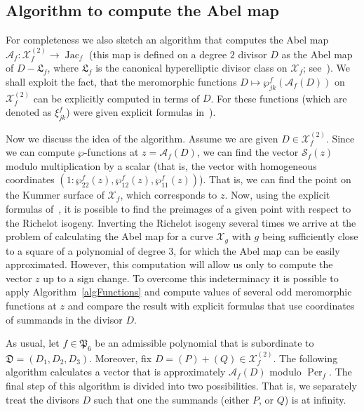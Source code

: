 \documentclass{amsart}
\numberwithin{equation}{section}
\theoremstyle{definition}
\theoremstyle{remark}
\DeclareMathOperator{\Jac}{Jac}
\DeclareMathOperator{\Per}{Per}
\begin{document}
	\subsection{Algorithm to compute the Abel map}
	For completeness we also sketch an algorithm that computes the Abel map $\mathscr A_f: \mathcal X_f^{(2)} \to \Jac_f$ (this map is defined on a degree $2$ divisor $D$ as the Abel map of $D - \mathfrak L_f$, where $\mathfrak L_f$ is the canonical hyperelliptic divisor class on $\mathcal X_f$; see~\cite{KleinianWeight2}). We shall exploit the fact, that the meromorphic functions $D \mapsto \wp_{jk}^f(\mathscr A_f(D))$ on $\mathcal X_f^{(2)}$ can be explicitly computed in terms of $D$. For these functions (which are denoted as $\xi_{jk}^f$) were given explicit formulas in~\cite[Section~2.2]{KleinianWeight2}). 
	
	Now we discuss the idea of the algorithm. Assume we are given $D \in \mathcal X_f^{(2)}$. Since we can compute $\wp$-functions at $z = \mathscr A_f(D)$, we can find the vector $\mathscr S_f(z)$ modulo multiplication by a scalar (that is, the vector with homogeneous coordinates $(1:\wp_{22}^f(z), \wp_{12}^f(z), \wp_{11}^f(z))$). That is, we can find the point on the Kummer surface of $\mathcal X_f$, which corresponds to $z$. Now, using the explicit formulas of~\cite{RichelotExpression}, it is possible to find the preimages of a given point with respect to the Richelot isogeny. Inverting the Richelot isogeny several times we arrive at the problem of calculating the Abel map for a curve $\mathcal X_g$ with $g$ being sufficiently close to a square of a polynomial of degree $3$, for which the Abel map can be easily approximated. However, this computation will allow us only to compute the vector $z$ up to a sign change. To overcome this indeterminacy it is possible to apply Algorithm~\ref{algFunctions} and compute values of several odd meromorphic functions at $z$ and compare the result with explicit formulas that use coordinates of summands in the divisor $D$. 
	
	As usual, let $f \in \mathfrak P_6$ be an admissible polynomial that is subordinate to $\mathfrak D = (D_1,D_2,D_3)$. Moreover, fix $D = (P) + (Q) \in \mathcal X_f^{(2)}$. The following algorithm calculates a vector that is approximately $\mathscr A_f(D)$ modulo $\Per_f$. The final step of this algorithm is divided into two possibilities. That is, we separately treat the divisors $D$ such that one the summands (either $P$, or $Q$) is at infinity.
	
\end{document}
